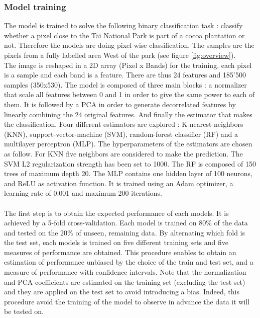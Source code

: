\documentclass[a4paper, 12pt]{article}
\begin{document}
        \subsubsection{Model training}
            The model is trained to solve the following binary classification task : classify whether a pixel close to the Taï National Park is part of a cocoa plantation or not. Therefore the models are doing pixel-wise classification. The samples are the pixels from a fully labelled area West of the park (see figure \ref{fig:overview}).\\
            The image is reshaped in a 2D array (Pixel x Bands) for the training, each pixel is a sample and each band is a feature. There are thus 24 features and 185'500 samples (350x530). The model is composed of three main blocks : a normalizer that scale all features between 0 and 1 in order to give the same power to each of them. It is followed by a PCA in order to generate decorrelated features by linearly combining the 24 original features. And finally the estimator that makes the classification. Four different estimators are explored : K-nearest-neighbors (KNN), support-vector-machine (SVM), random-forest classifier (RF) and a multilayer perceptron (MLP). The hyperparameters of the estimators are chosen as follow. For KNN five neighbors are considered to make the prediction. The SVM L2 regularization strength has been set to 1000. The RF is composed of 150 trees of maximum depth 20. The MLP contains one hidden layer of 100 neurons, and ReLU as activation function. It is trained using an Adam optimizer, a learning rate of 0.001 and maximum 200 iterations. \\
            \\
            The first step is to obtain the expected performance of each models. It is achieved by a 5-fold cross-validation. Each model is trained on 80\% of the data and tested on the 20\% of unseen, remaining data. By alternating which fold is the test set, each models is trained on five different training sets and five measures of performance are obtained. This procedure enables to obtain an estimation of performance unbiased by the choice of the train and test set, and a measure of performance with confidence intervals. Note that the normalization and PCA coefficients are estimated on the training set (excluding the test set) and they are applied on the test set to avoid introducing a bias. Indeed, this procedure avoid the training of the model to observe in advance the data it will be tested on.\\
\end{document}
